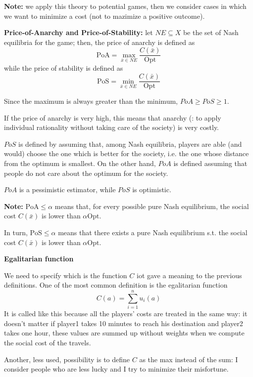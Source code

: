 \noindent \textbf{Note:} we apply this theory to potential games, then we 
consider cases in which we want to minimize a cost (not to mazimize a 
positive outcome).

\bigskip
\noindent \textbf{Price-of-Anarchy and Price-of-Stability:} let $NE \subseteq X$ be the set of Nash equilibria for the game; then, the price of anarchy is defined as
\[
	\text{PoA} = \max_{\bar{x} \in NE}{\frac{C(\bar{x})}{\text{Opt}}}
\]
while the price of stability is defined as
\[
\text{PoS} = \min_{\bar{x} \in NE}{\frac{C(\bar{x})}{\text{Opt}}}
\]

\noindent Since the maximum is always greater than the minimum, $PoA \geq PoS \geq 1$.

\noindent If the price of anarchy is very high, this means that anarchy 
(: to apply individual rationality without taking care of the society) is 
very costly. 

\noindent $PoS$ is defined by assuming that, among Nash equilibria, players 
are able (and would) choose the one which is better for the society, i.e. 
the one whose distance from the optimum is smallest. On the other hand, $PoA$ 
is defined assuming that people do not care about the optimum for the society.

\noindent $PoA$ is a pessimistic estimator, while $PoS$ is optimistic.

\noindent \textbf{Note:} $\text{PoA} \leq \alpha$ means that, for every possible pure Nash equilibrium, the social cost $C(\bar{x})$ is lower than $\alpha\text{Opt}$.

\noindent In turn, $\text{PoS} \leq \alpha$ means that there exists a pure Nash equilibrium s.t. the social cost $C(\bar{x})$ is lower than $\alpha\text{Opt}$.

\bigskip
\noindent \textbf{Egalitarian function}

\noindent We need to specify which is the function $C$ iot gave a meaning 
to the previous definitions. One of the most common definition is the 
egalitarian function
\[
	C(a) = \sum_{i=1}^{n}{u_i(a)}
\]
It is called like this because all the players' costs 
are treated in the same way: it doesn't matter if player1 takes 10 minutes 
to reach his destination and player2 takes one hour, these values are 
summed up without weights when we compute the social cost of the travels.

\noindent Another, less used, possibility is to define $C$ as the max 
instead of the sum: I consider people who are less lucky and I try to 
minimize their misfortune.

